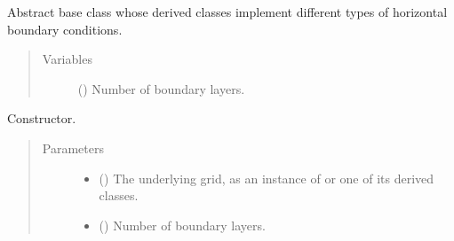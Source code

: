 \documentclass[letterpaper,10pt,english]{sphinxmanual}
\begin{document}
\begin{fulllineitems}
\label{\detokenize{api:dycore.horizontal_boundary.HorizontalBoundary}}
Abstract base class whose derived classes implement different types of horizontal boundary conditions.
\begin{quote}\begin{description}
\item[{Variables}] \leavevmode
{\hyperref[\detokenize{api:dycore.prognostic_isentropic.PrognosticIsentropic.nb}]{}} () \textendash{} Number of boundary layers.

\end{description}\end{quote}

\begin{fulllineitems}
\label{\detokenize{api:dycore.horizontal_boundary.HorizontalBoundary.__init__}}
Constructor.
\begin{quote}\begin{description}
\item[{Parameters}] \leavevmode\begin{itemize}
\item {} 
 () \textendash{} The underlying grid, as an instance of {\hyperref[\detokenize{api:grids.grid_xyz.GridXYZ}]{}} or one of its derived classes.

\item {} 
 () \textendash{} Number of boundary layers.

\end{itemize}

\end{description}\end{quote}

\end{fulllineitems}



\end{fulllineitems}
\end{document}
